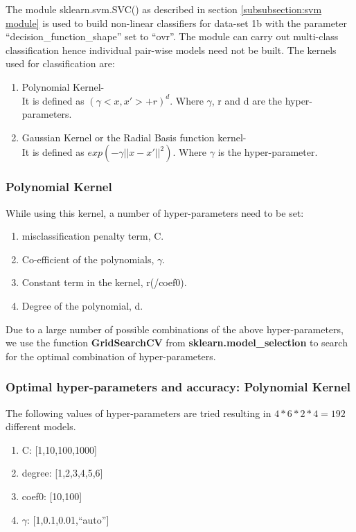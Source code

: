 \documentclass[11pt,a4paper]{article}
\newcommand{\noi}{\noindent}
\begin{document}
The module sklearn.svm.SVC() as described in section \ref{subsubsection:svm module} is used to build non-linear classifiers for data-set 1b with the parameter ``decision\_function\_shape'' set to ``ovr''. The module can carry out multi-class classification hence individual pair-wise models need not be built.  
\noi
The kernels used for classification are:
\begin{enumerate}
    \item Polynomial Kernel-\\
    It is defined as $(\gamma<x,x'>+r)^d$. Where $\gamma$, r and d are the hyper-parameters.
    \item Gaussian Kernel or the Radial Basis function kernel-\\
    It is defined as $exp(-\gamma||x-x'||^2)$. Where $\gamma$ is the hyper-parameter.
\end{enumerate}

\subsubsection{Polynomial Kernel}
While using this kernel, a number of hyper-parameters need to be set: 
\begin{enumerate}
    \item misclassification penalty term, C.
    \item Co-efficient of the polynomials, $\gamma$.
    \item Constant term in the kernel, r(/coef0).
    \item Degree of the polynomial, d.
\end{enumerate}

\noi
Due to a large number of possible combinations of the above hyper-parameters, we use the function \textbf{GridSearchCV} from \textbf{sklearn.model\_selection} to search for the optimal combination of hyper-parameters.

\subsubsection{Optimal hyper-parameters and accuracy: Polynomial Kernel}

The following values of hyper-parameters are tried resulting in $4*6*2*4=192$ different models.  
\begin{enumerate}
    \item C: [1,10,100,1000]
    \item degree: [1,2,3,4,5,6]
    \item coef0: [10,100]
    \item $\gamma$: [1,0.1,0.01,``auto'']
\end{enumerate}
\end{document}
